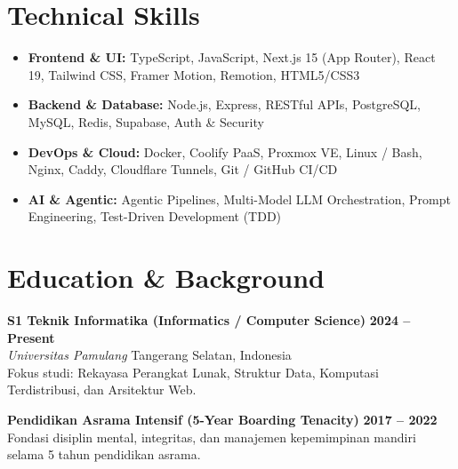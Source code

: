 \documentclass[a4paper,10pt]{article}
\begin{document}
\section{Technical Skills}
\begin{itemize}
    \item \textbf{Frontend \& UI:} TypeScript, JavaScript, Next.js 15 (App Router), React 19, Tailwind CSS, Framer Motion, Remotion, HTML5/CSS3
    \item \textbf{Backend \& Database:} Node.js, Express, RESTful APIs, PostgreSQL, MySQL, Redis, Supabase, Auth \& Security
    \item \textbf{DevOps \& Cloud:} Docker, Coolify PaaS, Proxmox VE, Linux / Bash, Nginx, Caddy, Cloudflare Tunnels, Git / GitHub CI/CD
    \item \textbf{AI \& Agentic:} Agentic Pipelines, Multi-Model LLM Orchestration, Prompt Engineering, Test-Driven Development (TDD)
\end{itemize}

\section{Education \& Background}

\textbf{S1 Teknik Informatika (Informatics / Computer Science)} \hfill \color{subtext}\textbf{2024 -- Present}\\
\textit{Universitas Pamulang} \hfill Tangerang Selatan, Indonesia\\
{\small Fokus studi: Rekayasa Perangkat Lunak, Struktur Data, Komputasi Terdistribusi, dan Arsitektur Web.}

\vspace{3pt}

\textbf{Pendidikan Asrama Intensif (5-Year Boarding Tenacity)} \hfill \color{subtext}\textbf{2017 -- 2022}\\
{\small Fondasi disiplin mental, integritas, dan manajemen kepemimpinan mandiri selama 5 tahun pendidikan asrama.}
\end{document}
